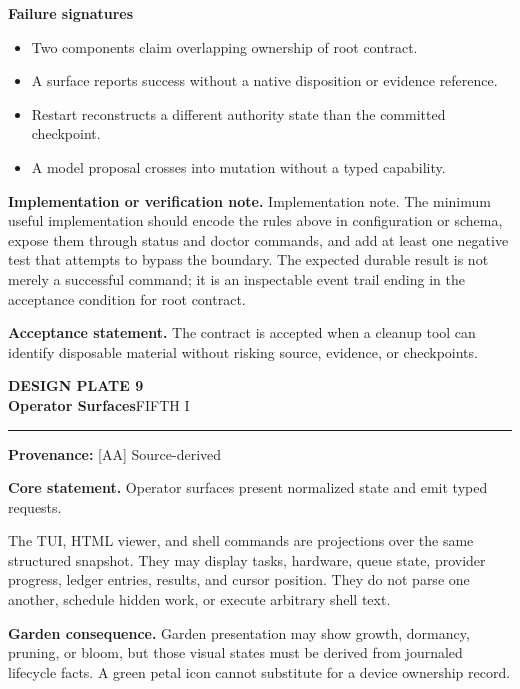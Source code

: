 \documentclass[10pt,letterpaper,oneside]{article}
\newcommand{\prov}[1]{\textcolor{gardenBlue}{\sffamily\footnotesize\textbf{Provenance:} #1}}
\newcommand{\platetitle}[3]{%
  \begin{minipage}[t][0.54in][t]{\textwidth}
  {\sffamily\bfseries\color{gardenDeep}\fontsize{9}{10}\selectfont DESIGN PLATE #1}\\[-1pt]
  {\sffamily\bfseries\color{gardenInk}\fontsize{16.5}{18}\selectfont #2}\hfill{\sffamily\color{gardenGreen}\large #3}
  \end{minipage}\vspace{-2pt}\hrule\vspace{5pt}}
\begin{document}
\textbf{Failure signatures}
\begin{itemize}
\item Two components claim overlapping ownership of root contract.
\item A surface reports success without a native disposition or evidence reference.
\item Restart reconstructs a different authority state than the committed checkpoint.
\item A model proposal crosses into mutation without a typed capability.
\end{itemize}
\textbf{Implementation or verification note.} Implementation note. The minimum useful implementation should encode the rules above in configuration or schema, expose them through status and doctor commands, and add at least one negative test that attempts to bypass the boundary. The expected durable result is not merely a successful command; it is an inspectable event trail ending in the acceptance condition for root contract.

\begin{acceptbox}
\textbf{Acceptance statement.} The contract is accepted when a cleanup tool can identify disposable material without risking source, evidence, or checkpoints.
\end{acceptbox}
\newpage
\platetitle{9}{Operator Surfaces}{FIFTH I}
\prov{[AA] Source-derived}
\fontsize{8.85}{10.45}\selectfont
\begin{corebox}
\textbf{Core statement.} Operator surfaces present normalized state and emit typed requests.
\end{corebox}
The TUI, HTML viewer, and shell commands are projections over the same structured snapshot. They may display tasks, hardware, queue state, provider progress, ledger entries, results, and cursor position. They do not parse one another, schedule hidden work, or execute arbitrary shell text.

\textbf{Garden consequence.} Garden presentation may show growth, dormancy, pruning, or bloom, but those visual states must be derived from journaled lifecycle facts. A green petal icon cannot substitute for a device ownership record.
\end{document}
